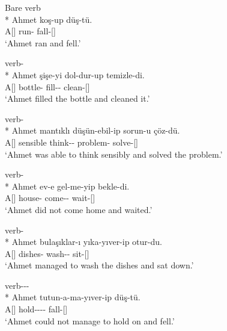 \begin{exe}
    \ex \label{ipintro}
    \begin{xlist}
    \ex Bare verb\\*
    \gll Ahmet koş-up düş-tü. \\ 
    A[{\Nom}] run-{\Pc} fall-{\Pst}[{\Tsg}] \\
    \glt `Ahmet ran and fell.'
    
    \ex verb-{\Caus}\\*
    \gll Ahmet şişe-yi dol-dur-up temizle-di. \\
    A[{\Nom}] bottle-{\Acc} fill-{\Caus}-{\Pc} clean-{\Pst}[{\Tsg}]\\
    \glt `Ahmet filled the bottle and cleaned it.'
    
    \ex verb-{\Abil}\\*
    \gll Ahmet mantıklı düşün-ebil-ip sorun-u çöz-dü. \\ 
    A[{\Nom}] sensible think-{\Abil}-{\Pc} problem-{\Acc} solve-{\Pst}[{\Tsg}] \\
    \glt `Ahmet was able to think sensibly and solved the problem.'
    
    \ex verb-{\Neg}\\*
    \gll Ahmet ev-e gel-me-yip bekle-di. \\
    A[{\Nom}] house-{\Dat} come-{\Neg}-{\Pc} wait-{\Pst}[{\Tsg}] \\
    \glt`Ahmet did not come home and waited.'
    
    \ex verb-{\Con}\\*
    \gll Ahmet bulaşıklar-ı yıka-yıver-ip otur-du. \\
    A[{\Nom}] dishes-{\Acc} wash-{\Con}-{\Pc} sit-{\Pst}[{\Tsg}]\\
    \glt `Ahmet managed to wash the dishes and sat down.'
    
    
    \ex verb-{\Abil}-{\Neg}-{\Con}\\*
    \gll Ahmet tutun-a-ma-yıver-ip düş-tü. \\ 
    A[{\Nom}] hold-{\Abil}-{\Neg}-{\Con}-{\Pc} fall-{\Pst}[{\Tsg}]\\
    \glt`Ahmet could not manage to hold on and fell.'
    \end{xlist}
\end{exe}

